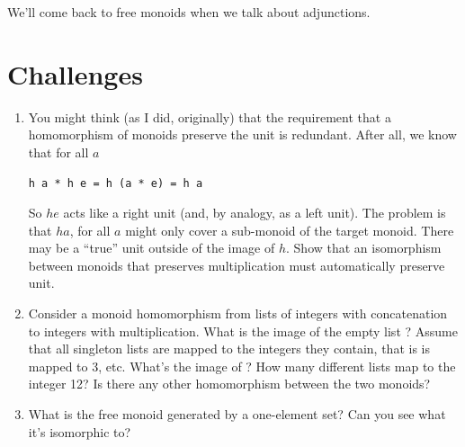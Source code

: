 We'll come back to free monoids when we talk about adjunctions.

\section{Challenges}

\begin{enumerate}
\tightlist
\item
  You might think (as I did, originally) that the requirement that a
  homomorphism of monoids preserve the unit is redundant. After all, we
  know that for all $a$

\begin{Verbatim}
h a * h e = h (a * e) = h a
\end{Verbatim}
  So $h e$ acts like a right unit (and, by analogy, as a left
  unit). The problem is that $h a$, for all $a$ might
  only cover a sub-monoid of the target monoid. There may be a ``true''
  unit outside of the image of $h$. Show that an isomorphism
  between monoids that preserves multiplication must automatically
  preserve unit.
\item
  Consider a monoid homomorphism from lists of integers with
  concatenation to integers with multiplication. What is the image of
  the empty list \code{{[}{]}}? Assume that all singleton lists are
  mapped to the integers they contain, that is \code{{[}3{]}} is
  mapped to 3, etc. What's the image of \code{{[}1, 2, 3, 4{]}}?
  How many different lists map to the integer 12? Is there any other
  homomorphism between the two monoids?
\item
  What is the free monoid generated by a one-element set? Can you see
  what it's isomorphic to?
\end{enumerate}